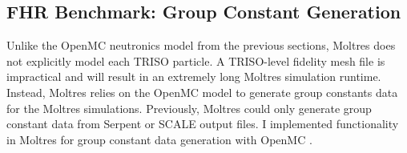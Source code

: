 \subsection{FHR Benchmark: Group Constant Generation}
\label{sec:fhr-bm-group-constant}
Unlike the OpenMC neutronics model from the previous sections, Moltres does not explicitly 
model each \gls{TRISO} particle. 
A TRISO-level fidelity mesh file is impractical and will result in an extremely long 
Moltres simulation runtime. 
Instead, Moltres relies on the OpenMC model to generate group constants data
for the Moltres simulations. 
Previously, Moltres could only generate group constant data from Serpent 
\cite{leppanen_serpent_2014} or SCALE \cite{bucholz_scale:_1982} output files. 
I implemented functionality in Moltres for group constant data generation with 
OpenMC \cite{lindsay_moltres_2017}. 

